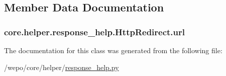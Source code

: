 \subsection{Member Data Documentation}
\hypertarget{classcore_1_1helper_1_1response__help_1_1HttpRedirect_a5f476d0180feb4e05d1b20a29a24d3cf}{
\subsubsection[{url}]{\setlength{\rightskip}{0pt plus 5cm}core.\-helper.\-response\-\_\-help.\-Http\-Redirect.\-url}}\label{classcore_1_1helper_1_1response__help_1_1HttpRedirect_a5f476d0180feb4e05d1b20a29a24d3cf}


The documentation for this class was generated from the following file\-:\begin{DoxyCompactItemize}
\item 
/wepo/core/helper/\hyperlink{response__help_8py}{response\-\_\-help.\-py}\end{DoxyCompactItemize}
